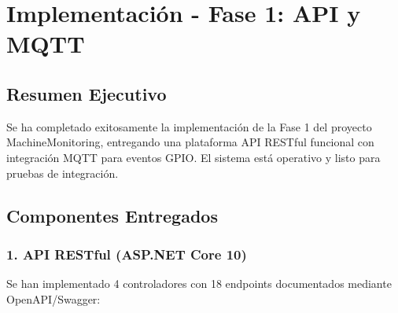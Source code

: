 \section{Implementación - Fase 1: API y MQTT}

\subsection{Resumen Ejecutivo}

Se ha completado exitosamente la implementación de la Fase 1 del proyecto MachineMonitoring, entregando una plataforma API RESTful funcional con integración MQTT para eventos GPIO. El sistema está operativo y listo para pruebas de integración.

\subsection{Componentes Entregados}

\subsubsection{1. API RESTful (ASP.NET Core 10)}

Se han implementado 4 controladores con 18 endpoints documentados mediante OpenAPI/Swagger:

